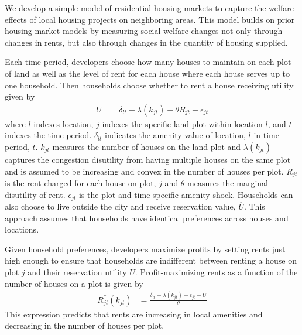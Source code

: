 \documentclass[12pt]{article}
\begin{document}
We develop a simple model of residential housing markets to capture the welfare effects of local housing projects on neighboring areas.  This model builds on prior housing market models by measuring social welfare changes not only through changes in rents, but also through changes in the quantity of housing supplied.  



Each time period, developers choose how many houses to maintain on each plot of land as well as the level of rent for each house where each house serves up to one household.  Then households choose whether to rent a house receiving utility given by
\begin{align*}
U &= \delta_{lt} - \lambda(k_{jt}) - \theta R_{jt}   + \epsilon_{jt}  
\end{align*}
\noindent where $l$ indexes location, $j$ indexes the specific land plot within location $l$, and $t$ indexes the time period.  $\delta_{lt}$ indicates the amenity value of location, $l$ in time period, $t$.  $k_{jt}$ measures the number of houses on the land plot and  $\lambda(k_{jt})$ captures the congestion disutility from having multiple houses on the same plot and is assumed to be increasing and convex in the number of houses per plot.  $R_{jt}$ is the rent charged for each house on plot, $j$ and $\theta$ measures the marginal disutility of rent.  $\epsilon_{jt}$ is the plot and time-specific amenity shock.  Households can also choose to live outside the city and receive reservation value, $\overline{U}$.  This approach assumes that households have identical preferences across houses and locations.  
 
Given household preferences, developers maximize profits by setting rents just high enough to ensure that households are indifferent between renting a house on plot $j$ and their reservation utility $\overline{U}$.  Profit-maximizing rents as a function of the number of houses on a plot is given by
\begin{align*}
R_{jt}^{*}(k_{jt}) &= \frac{ \delta_{lt} - \lambda(k_{jt}) + \epsilon_{jt} - \overline{U}}{\theta}
\end{align*}
This expression predicts that rents are increasing in local amenities and decreasing in the number of houses per plot.  
\end{document}
